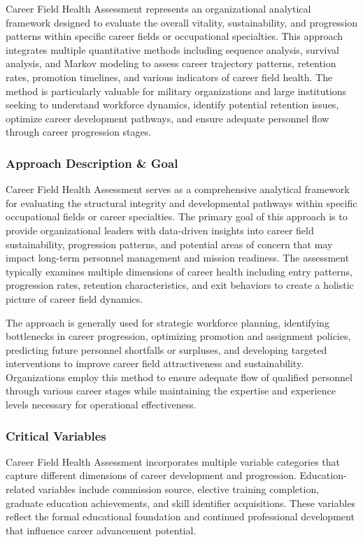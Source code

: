 \documentclass[main.tex]{subfiles}
\begin{document}
Career Field Health Assessment represents an organizational analytical framework designed to evaluate the overall vitality, sustainability, and progression patterns within specific career fields or occupational specialties. This approach integrates multiple quantitative methods including sequence analysis, survival analysis, and Markov modeling to assess career trajectory patterns, retention rates, promotion timelines, and various indicators of career field health. The method is particularly valuable for military organizations and large institutions seeking to understand workforce dynamics, identify potential retention issues, optimize career development pathways, and ensure adequate personnel flow through career progression stages.

\subsubsection{Approach Description \& Goal}

Career Field Health Assessment serves as a comprehensive analytical framework for evaluating the structural integrity and developmental pathways within specific occupational fields or career specialties. The primary goal of this approach is to provide organizational leaders with data-driven insights into career field sustainability, progression patterns, and potential areas of concern that may impact long-term personnel management and mission readiness\cite{afpc2005}. The assessment typically examines multiple dimensions of career health including entry patterns, progression rates, retention characteristics, and exit behaviors to create a holistic picture of career field dynamics.

The approach is generally used for strategic workforce planning, identifying bottlenecks in career progression, optimizing promotion and assignment policies, predicting future personnel shortfalls or surpluses, and developing targeted interventions to improve career field attractiveness and sustainability. Organizations employ this method to ensure adequate flow of qualified personnel through various career stages while maintaining the expertise and experience levels necessary for operational effectiveness.

\subsubsection{Critical Variables}

Career Field Health Assessment incorporates multiple variable categories that capture different dimensions of career development and progression. Education-related variables include commission source, elective training completion, graduate education achievements, and skill identifier acquisitions\cite{potential2024}. These variables reflect the formal educational foundation and continued professional development that influence career advancement potential.
\end{document}
